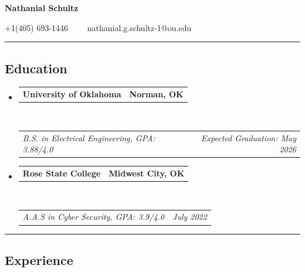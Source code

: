 \documentclass[10pt,letterpaper]{article}
\makeatletter
\newcommand{\headerrow}[2]
{\begin{tabular*}{\linewidth}{l@{\extracolsep{\fill}}r}
	#1 &
	#2 \\
\end{tabular*}}
\makeatother
\begin{document}
\begin{center}
{\LARGE \textbf{Nathanial Schultz}}

\vspace{0.3em}
+1(405) 693-1446\ \ \textbullet
\ \ nathanial.g.schultz-1@ou.edu
\end{center}

\hrule
\vspace{-0.4em}
\subsection*{Education}

\begin{itemize}
	\parskip=0.1em

	\item 
	\headerrow
		{\textbf{University of Oklahoma}}
		{\textbf{Norman, OK}}
	\\
	\headerrow
		{\emph{B.S. in Electrical Engineering, GPA: 3.88/4.0}}
		{\emph{Expected Graduation: May 2026}}

	\item 
	\headerrow
		{\textbf{Rose State College}}
		{\textbf{Midwest City, OK}}
	\\
	\headerrow
		{\emph{A.A.S in Cyber Security, GPA: 3.9/4.0}}
		{\emph{July 2022}}
\end{itemize}

\hrule
\vspace{-0.4em}
\subsection*{Experience}
\end{document}

